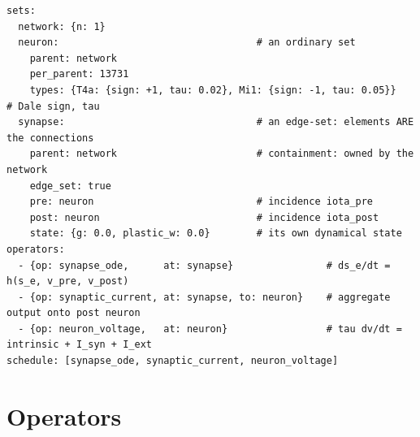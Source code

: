 \documentclass[11pt]{article}
\newcommand{\code}[1]{\texttt{#1}}
\begin{document}
\begin{lstlisting}[style=yaml,caption={A recurrent circuit as one hierarchy: a \code{neuron} set and a \code{synapse} edge-set, both contained in the \code{network}, the synapse joined to the neurons by \code{pre}/\code{post} incidence maps.},label=lst:neuro]
sets:
  network: {n: 1}
  neuron:                                  # an ordinary set
    parent: network
    per_parent: 13731
    types: {T4a: {sign: +1, tau: 0.02}, Mi1: {sign: -1, tau: 0.05}}   # Dale sign, tau
  synapse:                                 # an edge-set: elements ARE the connections
    parent: network                        # containment: owned by the network
    edge_set: true
    pre: neuron                            # incidence iota_pre
    post: neuron                           # incidence iota_post
    state: {g: 0.0, plastic_w: 0.0}        # its own dynamical state
operators:
  - {op: synapse_ode,      at: synapse}                # ds_e/dt = h(s_e, v_pre, v_post)
  - {op: synaptic_current, at: synapse, to: neuron}    # aggregate output onto post neuron
  - {op: neuron_voltage,   at: neuron}                 # tau dv/dt = intrinsic + I_syn + I_ext
schedule: [synapse_ode, synaptic_current, neuron_voltage]
\end{lstlisting}

\section{Operators}
\label{sec:operators}
\end{document}
